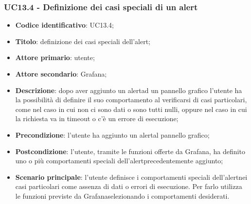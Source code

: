 \subsubsection{UC13.4 - Definizione dei casi speciali di un alert}
	\begin{itemize}
	\item \textbf{Codice identificativo}: UC13.4;
	\item \textbf{Titolo}: definizione dei casi speciali dell'alert\glo;
	\item \textbf{Attore primario}: utente;
	\item \textbf{Attore secondario}: Grafana\glo;
	\item \textbf{Descrizione}: dopo aver aggiunto un alert\glosp ad un pannello grafico l'utente ha la possibilità di definire il suo comportamento al verificarsi di casi particolari, come nel caso in cui non ci sono dati o sono tutti nulli, oppure nel caso in cui la richiesta va in timeout o c'è un errore di esecuzione;
	\item \textbf{Precondizione}: l'utente ha aggiunto un alert\glosp al pannello grafico;
	\item \textbf{Postcondizione}: l'utente, tramite le funzioni offerte da Grafana\glosp, ha definito uno o più comportamenti speciali dell'alert\glosp precedentemente aggiunto;
	\item \textbf{Scenario principale}: l'utente definisce i comportamenti speciali dell'alert\glosp nei casi particolari come assenza di dati o errori di esecuzione. Per farlo utilizza le funzioni previste da Grafana\glosp selezionando i comportamenti desiderati.
\end{itemize} 
